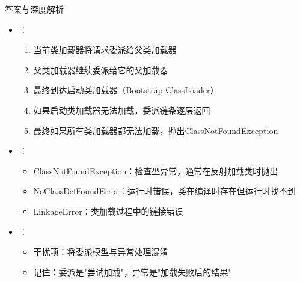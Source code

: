 \documentclass[12pt, a4paper]{ctexart}
\begin{document}
\begin{enumerate}[label=\textbf{\arabic*.}]
\begin{bluebox}{答案与深度解析}
\begin{itemize}[leftmargin=*, nosep]
			      \item {}：
			            \begin{enumerate}
				            \item 当前类加载器将请求委派给父类加载器
				            \item 父类加载器继续委派给它的父加载器
				            \item 最终到达启动类加载器（Bootstrap ClassLoader）
				            \item 如果启动类加载器无法加载，委派链条逐层返回
				            \item 最终如果所有类加载器都无法加载，抛出ClassNotFoundException
			            \end{enumerate}

			      \item {}：
			            \begin{itemize}
				            \item ClassNotFoundException：检查型异常，通常在反射加载类时抛出
				            \item NoClassDefFoundError：运行时错误，类在编译时存在但运行时找不到
				            \item LinkageError：类加载过程中的链接错误
			            \end{itemize}

			      \item {}：
			            \begin{itemize}
				            \item 干扰项：将委派模型与异常处理混淆
				            \item 记住：委派是"尝试加载"，异常是"加载失败后的结果"
			            \end{itemize}
		      \end{itemize}


\end{bluebox}
\end{enumerate}
\end{document}
